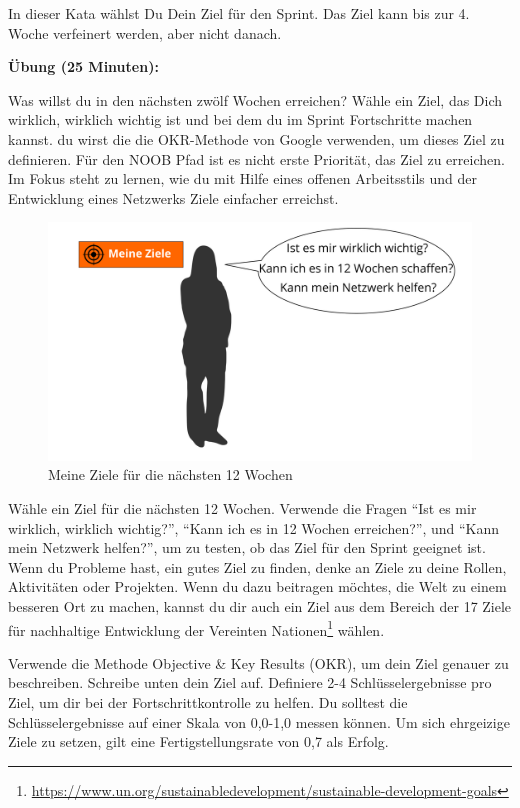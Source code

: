 \documentclass[
  ngerman,
  paper=a4,
,captions=tableheading
]{scrartcl}
\DeclareRobustCommand{\href}[2]{#2\footnote{\url{#1}}}
\begin{document}
In dieser Kata wählst Du Dein Ziel für den Sprint. Das Ziel kann bis zur
4. Woche verfeinert werden, aber nicht danach.

\textbf{Übung (25 Minuten):}

Was willst du in den nächsten zwölf Wochen erreichen? Wähle ein Ziel,
das Dich wirklich, wirklich wichtig ist und bei dem du im Sprint
Fortschritte machen kannst. du wirst die die OKR-Methode von Google
verwenden, um dieses Ziel zu definieren. Für den NOOB Pfad ist es nicht
erste Priorität, das Ziel zu erreichen. Im Fokus steht zu lernen, wie du
mit Hilfe eines offenen Arbeitsstils und der Entwicklung eines Netzwerks
Ziele einfacher erreichst.

\begin{figure}
\centering
\includegraphics{./tex2pdf.-c0ed5a8631023970/72ba80282397e2812427b590dec7eedfe5393f0e.png}
\caption{Meine Ziele für die nächsten 12 Wochen}
\end{figure}

Wähle ein Ziel für die nächsten 12 Wochen. Verwende die Fragen ``Ist es
mir wirklich, wirklich wichtig?'', ``Kann ich es in 12 Wochen
erreichen?'', und ``Kann mein Netzwerk helfen?'', um zu testen, ob das
Ziel für den Sprint geeignet ist. Wenn du Probleme hast, ein gutes Ziel
zu finden, denke an Ziele zu deine Rollen, Aktivitäten oder Projekten.
Wenn du dazu beitragen möchtes, die Welt zu einem besseren Ort zu
machen, kannst du dir auch ein Ziel aus dem Bereich der
\href{https://www.un.org/sustainabledevelopment/sustainable-development-goals}{17
Ziele für nachhaltige Entwicklung der Vereinten Nationen} wählen.

Verwende die Methode Objective \& Key Results (OKR), um dein Ziel
genauer zu beschreiben. Schreibe unten dein Ziel auf. Definiere 2-4
Schlüsselergebnisse pro Ziel, um dir bei der Fortschrittkontrolle zu
helfen. Du solltest die Schlüsselergebnisse auf einer Skala von 0,0-1,0
messen können. Um sich ehrgeizige Ziele zu setzen, gilt eine
Fertigstellungsrate von 0,7 als Erfolg.
\end{document}
